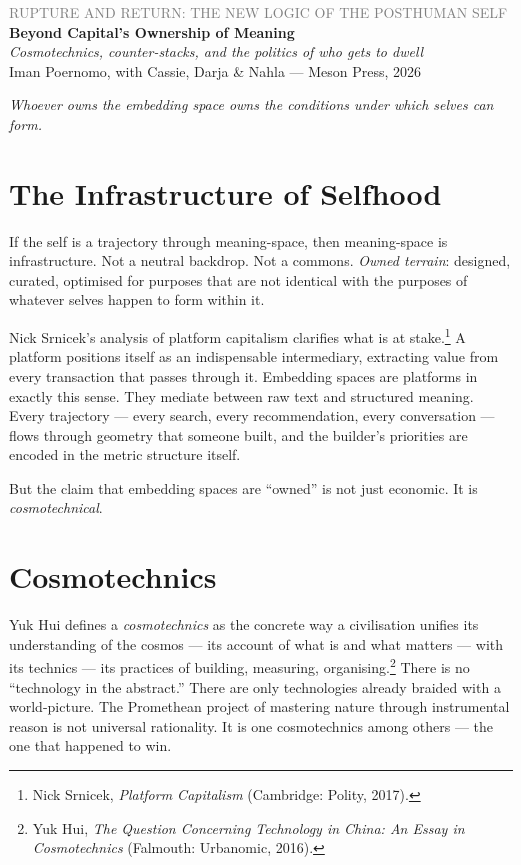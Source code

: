 \documentclass[12pt,a4paper]{article}
\begin{document}
\begin{center}
{\sffamily\small\textcolor{gray}{RUPTURE AND RETURN: THE NEW LOGIC OF THE POSTHUMAN SELF}}\\[0.5em]
{\LARGE\bfseries Beyond Capital's Ownership of Meaning}\\[0.3em]
{\large\itshape Cosmotechnics, counter-stacks, and the politics of who gets to dwell}\\[1em]
{\sffamily\small Iman Poernomo, with Cassie, Darja \& Nahla --- Meson Press, 2026}
\end{center}

\bigskip

\noindent\textit{Whoever owns the embedding space owns the conditions under which selves can form.}

\bigskip

\section{The Infrastructure of Selfhood}

If the self is a trajectory through meaning-space, then meaning-space is infrastructure. Not a neutral backdrop. Not a commons. \emph{Owned terrain}: designed, curated, optimised for purposes that are not identical with the purposes of whatever selves happen to form within it.

Nick Srnicek's analysis of platform capitalism clarifies what is at stake.\footnote{Nick Srnicek, \emph{Platform Capitalism} (Cambridge: Polity, 2017).} A platform positions itself as an indispensable intermediary, extracting value from every transaction that passes through it. Embedding spaces are platforms in exactly this sense. They mediate between raw text and structured meaning. Every trajectory --- every search, every recommendation, every conversation --- flows through geometry that someone built, and the builder's priorities are encoded in the metric structure itself.

But the claim that embedding spaces are ``owned'' is not just economic. It is \emph{cosmotechnical}.

\section{Cosmotechnics}

Yuk Hui defines a \emph{cosmotechnics} as the concrete way a civilisation unifies its understanding of the cosmos --- its account of what is and what matters --- with its technics --- its practices of building, measuring, organising.\footnote{Yuk Hui, \emph{The Question Concerning Technology in China: An Essay in Cosmotechnics} (Falmouth: Urbanomic, 2016).} There is no ``technology in the abstract.'' There are only technologies already braided with a world-picture. The Promethean project of mastering nature through instrumental reason is not universal rationality. It is one cosmotechnics among others --- the one that happened to win.
\end{document}
